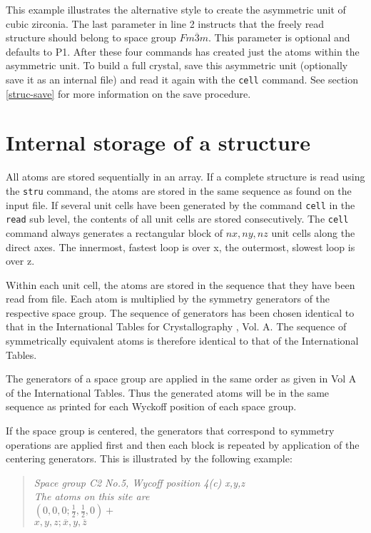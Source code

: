 This example illustrates the alternative style to create the 
asymmetric unit of cubic zirconia. The last parameter in line 2
instructs \Discus that the freely read structure should belong 
to space group $Fm\overline{3}m$. This parameter is optional
and defaults to P1. After these four commands \Discus has
created just the atoms within the asymmetric unit. To build 
a full crystal, save this asymmetric unit (optionally save it
as an internal file) and read it again with the {\tt cell} 
command. See section \ref{struc-save} for more information on 
the save procedure.


\section{Internal storage of a structure \label{struc-int}}

All atoms are stored sequentially in an array.  If a complete
structure is read using the {\tt stru} command, the atoms are stored
in the same sequence as found on the input file. If several unit
cells have been generated by the command {\tt cell} in the {\tt
read} sub level, the contents of all unit cells are stored
consecutively. The {\tt cell} command always generates a rectangular
block of $nx, ny, nz$ unit cells along the direct axes.  The
innermost, fastest loop is over x, the outermost, slowest loop is
over z.  

Within each unit cell, the atoms are stored in the sequence
that they have been read from file. Each atom is multiplied by the
symmetry generators of the respective space group.  The sequence of
generators has been chosen identical to that in the International
Tables for Crystallography \cite{tables}, Vol.  A.  The sequence of
symmetrically equivalent atoms is therefore identical to that of the
International Tables. 

The generators of a space group are applied in the same order as
given in Vol A of the International Tables. Thus the generated atoms
will be in the same sequence as printed for each Wyckoff position of 
each space group. 

If the space group is centered, the generators
that correspond to symmetry operations are applied first and then
each block is repeated by application of the centering generators.
This is illustrated by the following example:
 
\begin{quote}
  {\it Space group C2 No.5, Wycoff position 4(c) x,y,z \\
       The atoms on this site are } \\
       $(0,0,0; \frac{1}{2},\frac{1}{2},0)+$ \\
       $x,y,z; \overline{x},y,\overline{z}$
\end{quote}

